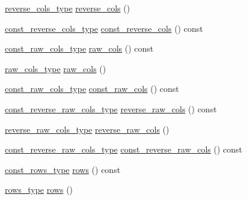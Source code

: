 \begin{DoxyCompactItemize}
\item 
\hyperlink{classIceBRG_1_1labeled__array_ae1a285122696e956d2bf21b147f94f9d}{reverse\+\_\+cols\+\_\+type} \hyperlink{classIceBRG_1_1labeled__array_a966302d8d6076e81e83f91e1499af7ec}{reverse\+\_\+cols} ()
\item 
\hyperlink{classIceBRG_1_1labeled__array_ac510eb93a7d0a73793dc7b381e8684ff}{const\+\_\+reverse\+\_\+cols\+\_\+type} \hyperlink{classIceBRG_1_1labeled__array_aa2644da3c9148940a51465e07536710b}{const\+\_\+reverse\+\_\+cols} () const 
\item 
\hyperlink{classIceBRG_1_1labeled__array_a6aed831097e39e3fdd483625fea14042}{const\+\_\+raw\+\_\+cols\+\_\+type} \hyperlink{classIceBRG_1_1labeled__array_a569c235253cf98a00d6d18c283f647c4}{raw\+\_\+cols} () const 
\item 
\hyperlink{classIceBRG_1_1labeled__array_a5135379d418bba0a185e5c26a9774f78}{raw\+\_\+cols\+\_\+type} \hyperlink{classIceBRG_1_1labeled__array_a8c84d7a61411ac2eaa7ad4879905b885}{raw\+\_\+cols} ()
\item 
\hyperlink{classIceBRG_1_1labeled__array_a6aed831097e39e3fdd483625fea14042}{const\+\_\+raw\+\_\+cols\+\_\+type} \hyperlink{classIceBRG_1_1labeled__array_a6fd5061f0ffd0d1cb3682fedd6d221b1}{const\+\_\+raw\+\_\+cols} () const 
\item 
\hyperlink{classIceBRG_1_1labeled__array_ae4061b413f50fe4f35caacf5318ba324}{const\+\_\+reverse\+\_\+raw\+\_\+cols\+\_\+type} \hyperlink{classIceBRG_1_1labeled__array_ab4227a19e5370b2412dfa561b39d7c3f}{reverse\+\_\+raw\+\_\+cols} () const 
\item 
\hyperlink{classIceBRG_1_1labeled__array_a38a503b3f572b6be9ec11f817f61bb17}{reverse\+\_\+raw\+\_\+cols\+\_\+type} \hyperlink{classIceBRG_1_1labeled__array_a80e2b57fbf2be63be17ee5dfb75a9266}{reverse\+\_\+raw\+\_\+cols} ()
\item 
\hyperlink{classIceBRG_1_1labeled__array_ae4061b413f50fe4f35caacf5318ba324}{const\+\_\+reverse\+\_\+raw\+\_\+cols\+\_\+type} \hyperlink{classIceBRG_1_1labeled__array_a8fd0ee3706d2c48d93fbc7b13691bdc4}{const\+\_\+reverse\+\_\+raw\+\_\+cols} () const 
\item 
\hyperlink{classIceBRG_1_1labeled__array_a6aec05e454845b2750b446c00fd4c9fb}{const\+\_\+rows\+\_\+type} \hyperlink{classIceBRG_1_1labeled__array_a579a6d73cac4545daeecfe4a3ef6d948}{rows} () const 
\item 
\hyperlink{classIceBRG_1_1labeled__array_a9d293f119488089606bb583de7d22b7c}{rows\+\_\+type} \hyperlink{classIceBRG_1_1labeled__array_a1dbf23ce1f1afd60294a97800a8915ad}{rows} ()

\end{DoxyCompactItemize}
